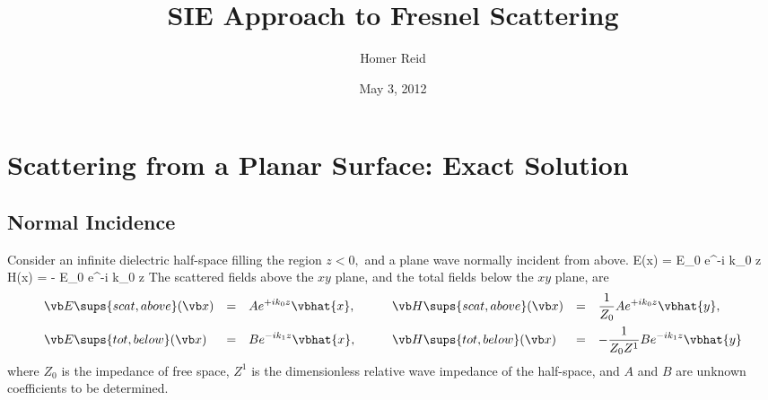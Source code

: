 \documentclass{article}
\title{SIE Approach to Fresnel Scattering}
\author {Homer Reid}
\date {May 3, 2012}
\begin{document}
\maketitle

\pagestyle{myheadings}


\tableofcontents 

\newpage
\section{Scattering from a Planar Surface: Exact Solution}

\subsection*{Normal Incidence}

Consider an infinite dielectric half-space filling the region $z<0,$
and a plane wave normally incident from above.
{
  \vb E(\vb x) = E_0 e^{-i k_0 z}   \qquad
  \vb H(\vb x) = - E_0 e^{-i k_0 z} 
}
The scattered fields above the $xy$ plane, and the total fields below 
the $xy$ plane, are 
$$\begin{array}{lcllcl}
 \displaystyle{
  \vb E\sups{scat,above}(\vb x) 
              }
 &=
 &
 \displaystyle{
   A e^{+ik_0z}\vbhat{x}, 
              }
\qquad  
 &\displaystyle{
  \vb H\sups{scat,above}(\vb x) 
               }
 &= 
 &\displaystyle{
  \frac{1}{Z_0} A e^{+ik_0z}\vbhat{y}, 
               }
\\[10pt]
 \displaystyle{
  \vb E\sups{tot,below}(\vb x) 
              }
 &=
 &
 \displaystyle{
   B e^{-ik_1z}\vbhat{x}, 
              }
\qquad  
 &\displaystyle{
  \vb H\sups{tot,below}(\vb x) 
               }
 &= 
 &\displaystyle{
  -\frac{1}{Z_0 Z^1} B e^{-ik_1z}\vbhat{y}
               }
\end{array}$$
where $Z_0$ is the impedance of free space, 
$Z^1$ is the dimensionless relative wave impedance 
of the half-space, and $A$ and $B$ are unknown 
coefficients to be determined.
\end{document}
